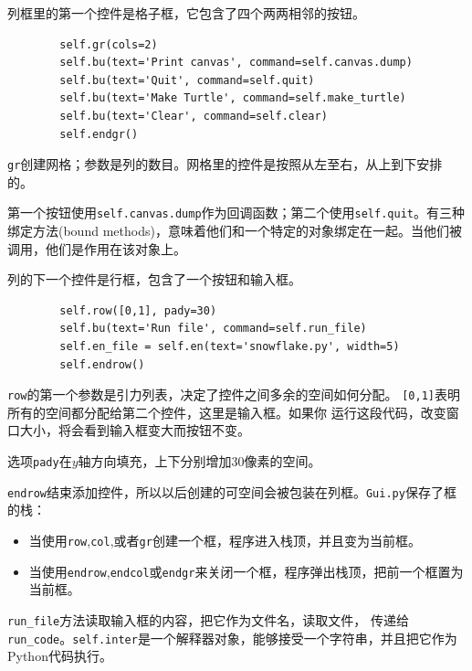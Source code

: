列框里的第一个控件是格子框，它包含了四个两两相邻的按钮。

\beforeverb
\begin{verbatim}
        self.gr(cols=2)
        self.bu(text='Print canvas', command=self.canvas.dump)
        self.bu(text='Quit', command=self.quit)
        self.bu(text='Make Turtle', command=self.make_turtle)
        self.bu(text='Clear', command=self.clear)
        self.endgr()
\end{verbatim}
\afterverb
%

{\tt gr}创建网格；参数是列的数目。网格里的控件是按照从左至右，从上到下安排的。


第一个按钮使用{\tt self.canvas.dump}作为回调函数；第二个使用{\tt self.quit}。有三种绑定方法(bound methods)，意味着他们和一个特定的对象绑定在一起。当他们被调用，他们是作用在该对象上。

列的下一个控件是行框，包含了一个按钮和输入框。

\beforeverb
\begin{verbatim}
        self.row([0,1], pady=30)
        self.bu(text='Run file', command=self.run_file)
        self.en_file = self.en(text='snowflake.py', width=5)
        self.endrow()
\end{verbatim}
\afterverb

{\tt row}的第一个参数是引力列表，决定了控件之间多余的空间如何分配。
{\tt [0,1]}表明所有的空间都分配给第二个控件，这里是输入框。如果你
运行这段代码，改变窗口大小，将会看到输入框变大而按钮不变。

选项{\tt pady}在$y$轴方向填充，上下分别增加30像素的空间。

{\tt endrow}结束添加控件，所以以后创建的可空间会被包装在列框。{\tt Gui.py}保存了框的栈：

\begin{itemize}

\item 当使用{\tt row},{\tt col},或者{\tt gr}创建一个框，程序进入栈顶，并且变为当前框。

\item 当使用{\tt endrow},{\tt endcol}或{\tt endgr}来关闭一个框，程序弹出栈顶，把前一个框置为当前框。

\end{itemize}

\verb"run_file"方法读取输入框的内容，把它作为文件名，读取文件，
传递给\verb"run_code"。{\tt self.inter}是一个解释器对象，能够接受一个字符串，并且把它作为Python代码执行。

